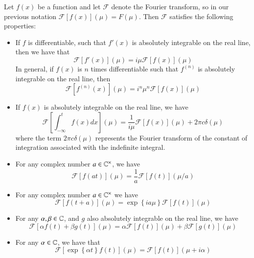 \documentclass[12pt, a4paper, oneside, openright, titlepage]{book}
\begin{document}
\begin{prop}
    Let $f(x)$ be a function and let $\mathcal{F}$ denote the Fourier transform, so in our previous notation $\mathcal{F}[f(x)](\mu) = F(\mu)$. Then $\mathcal{F}$ satisfies the following properties: \begin{itemize}
        \item If $f$ is differentiable, such that $f'(x)$ is absolutely integrable on the real line, then we have that \begin{equation}
                \mathcal{F}[f'(x)](\mu) = i\mu\mathcal{F}[f(x)](\mu)
        \end{equation}
            In general, if $f(x)$ is $n$ times differentiable such that $f^{(n)}$ is absolutely integrable on the real line, then \begin{equation}
                \mathcal{F}[f^{(n)}(x)](\mu) = i^n\mu^n\mathcal{F}[f(x)](\mu)
            \end{equation}
        \item If $f(x)$ is absolutely integrable on the real line, we have \begin{equation}
                \mathcal{F}\left[\int_{-\infty}^tf(x)dx\right](\mu) = \frac{1}{i\mu}\mathcal{F}[f(x)](\mu)+2\pi c\delta(\mu)
        \end{equation}
            where the term $2\pi c\delta(\mu)$ represents the Fourier transform of the constant of integration associated with the indefinite integral.
        \item For any complex number $a \in \mathbb C^{\times}$, we have \begin{equation}
                \mathcal{F}[f(at)](\mu) = \frac{1}{a}\mathcal{F}[f(t)](\mu/a)
        \end{equation}
        \item For any complex number $a \in \mathbb C^{\times}$ we have \begin{equation}
            \mathcal{F}[f(t+a)](\mu) = \exp\left\{ia\mu\right\}\mathcal{F}[f(t)](\mu)
        \end{equation}
        \item For any $\alpha, \beta \in \mathbb C$, and $g$ also absolutely integrable on the real line, we have \begin{equation}
            \mathcal{F}[\alpha f(t)+\beta g(t)](\mu) = \alpha\mathcal{F}[f(t)](\mu) + \beta\mathcal{F}[g(t)](\mu)
        \end{equation}
        \item For any $\alpha \in \mathbb C$, we have that \begin{equation}
                \mathcal{F}[\exp\left\{\alpha t\right\}f(t)](\mu) = \mathcal{F}[f(t)](\mu+i\alpha)
        \end{equation}
    \end{itemize}
\end{prop}
\end{document}
